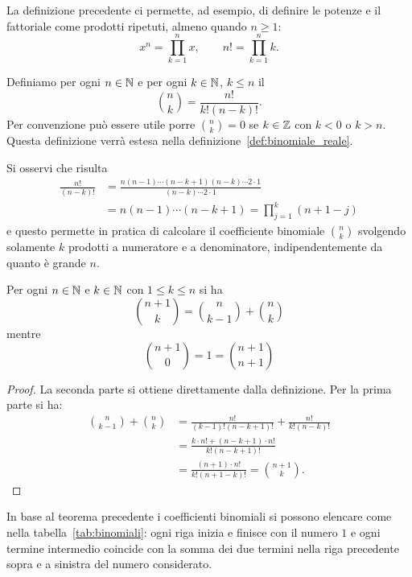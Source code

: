 La definizione precedente ci permette, ad esempio, di definire le potenze e il fattoriale
come prodotti ripetuti, almeno quando $n\ge 1$:
\[
  x^n = \prod_{k=1}^n x, \qquad
  n! = \prod_{k=1}^n k.
\]

\begin{definition}
\label{def:binomiale}
\mymark{***}
Definiamo per ogni $n\in \mathbb N$ e per ogni $k\in \mathbb N$, $k\le n$
il 
\[
{n \choose k}
=\frac{n!}{k!(n-k)!}.
\]
Per convenzione può essere utile porre
${n \choose k}=0$ se $k\in \mathbb Z$ con $k< 0$ o $k>n$.
Questa definizione verrà estesa nella definizione~\ref{def:binomiale_reale}.
\end{definition}
%
Si osservi che risulta
\begin{align*}
\frac{n!}{(n-k)!} &= \frac{n (n-1) \cdots (n-k+1)(n-k) \cdots 2\cdot 1}{(n-k) \cdots 2\cdot 1}\\
 &= n (n-1) \cdots (n-k+1) = \prod_{j=1}^k (n+1-j)
\end{align*}
e questo permette in pratica di calcolare il coefficiente binomiale ${n \choose k}$
svolgendo solamente $k$ prodotti a numeratore e a denominatore, indipendentemente
da quanto è grande $n$.

\begin{theorem}
\mymark{*}
Per ogni $n\in \mathbb N$ e $k \in \mathbb N$ con $1 \le k \le n$ si ha
\[
  {n+1 \choose k} =
      {n \choose k-1} + {n \choose k}
\]
mentre
\[
  {n+1 \choose 0} = 1 = {n+1 \choose n+1}
\]
\end{theorem}
%
\begin{proof}
La seconda parte si ottiene direttamente dalla definizione.
Per la prima parte si ha:
\begin{align*}
{n \choose k-1} + {n \choose k}
&= \frac{n!}{(k-1)!(n-k+1)!} + \frac{n!}{k!(n-k)!} \\
&= \frac{k\cdot n! + (n-k+1)\cdot n!}{k!(n-k+1)!} \\
&= \frac{(n+1)\cdot n!}{k!(n+1-k)!}
= {n+1 \choose k}.
\end{align*}
\end{proof}

In base al teorema precedente i coefficienti binomiali si possono
elencare come nella tabella~\ref{tab:binomiali}:
ogni riga inizia e finisce con il numero $1$
e ogni termine intermedio coincide con la somma dei
due termini nella riga precedente sopra e
a sinistra del numero considerato.

